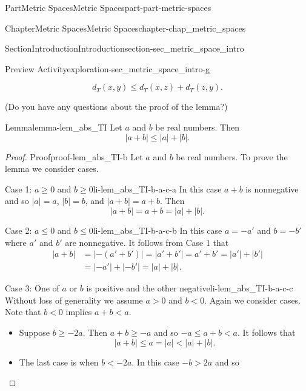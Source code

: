 \documentclass[oneside,10pt,]{book}
\numberwithin{equation}{chapter}
\newcommand{\lt}{<}
\newcommand{\gt}{>}
\newcommand{\amp}{&}
\begin{document}
\begin{partptx}{Part}{Metric Spaces}{}{Metric Spaces}{}{}{part-part-metric-spaces}
\begin{chapterptx}{Chapter}{Metric Spaces}{}{Metric Spaces}{}{}{chapter-chap_metric_spaces}
\begin{sectionptx}{Section}{Introduction}{}{Introduction}{}{}{section-sec_metric_space_intro}
\begin{exploration}{Preview Activity}{}{exploration-sec_metric_space_intro-g}
\begin{enumerate}[font=\bfseries,label=(\alph*),ref=\alph*]
\begin{equation*}
d_T(x,y) \leq d_T(x,z) + d_T(z,y)\text{.}
\end{equation*}
%
\par
(Do you have any questions about the proof of the lemma?)%
\begin{lemma}{Lemma}{}{}{lemma-lem_abs_TI}%
Let \(a\) and \(b\) be real numbers. Then%
\begin{equation*}
| a+b | \leq | a | + | b |\text{.}
\end{equation*}
%
\end{lemma}
\begin{proof}{Proof}{}{proof-lem_abs_TI-b}
Let \(a\) and \(b\) be real numbers. To prove the lemma we consider cases.%
\begin{descriptionlist}
\begin{dlinarrow}{Case 1: \(a \geq 0\) and \(b \geq 0\)}{li-lem_abs_TI-b-a-c-a}%
In this case \(a+b\) is nonnegative and so \(| a | = a\), \(| b | = b\), and \(| a+b | = a+b\). Then%
\begin{equation*}
| a+b | = a+b =  | a | + | b |\text{.}
\end{equation*}
%
\end{dlinarrow}%
\begin{dlinarrow}{Case 2: \(a \leq 0\) and \(b \leq 0\)}{li-lem_abs_TI-b-a-c-b}%
In this case \(a = -a'\) and \(b = -b'\) where \(a'\) and \(b'\) are nonnegative. It follows from Case 1 that%
\begin{align*}
| a+b | \amp = | -(a'+b') | = | a'+b' | = a'+b' = | a' | + | b' |\\
\amp = | -a' | + | -b' | = | a | + | b |\text{.}
\end{align*}
%
\end{dlinarrow}%
\begin{dlinarrow}{Case 3: One of \(a\) or \(b\) is positive and the other negative}{li-lem_abs_TI-b-a-c-c}%
Without loss of generality we assume \(a \gt 0\) and \(b \lt 0\). Again we consider cases. Note that \(b \lt 0\) implies \(a+b \lt a\).%
\begin{itemize}[label=\textbullet]
\item{}Suppose \(b \geq -2a\). Then \(a+b \geq -a\) and so \(-a \leq a+b \lt  a\). It follows that%
\begin{equation*}
| a+b | \leq a = | a | \lt  | a | + | b |\text{.}
\end{equation*}
%
\item{}The last case is when \(b \lt  -2a\). In this case \(-b \gt 2a\) and so%
\begin{equation*}

\end{equation*}
\end{itemize}
\end{dlinarrow}
\end{descriptionlist}
\end{proof}
\end{enumerate}
\end{exploration}
\end{sectionptx}
\end{chapterptx}
\end{partptx}
\end{document}

